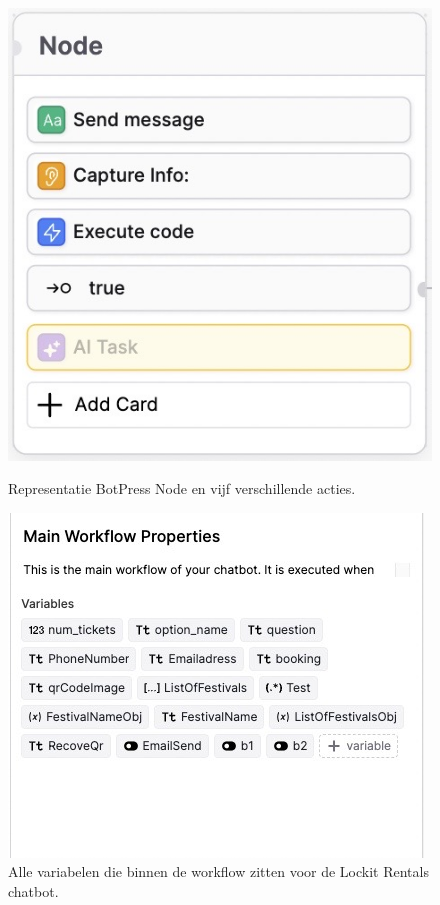 \begin{figure}[h]
    \centering
    \begin{minipage}{0.45\textwidth}
        \centering
        \includegraphics[width=\textwidth]{graphics/F31_botpress_Acties.jpg}
        \caption{Representatie BotPress Node en vijf verschillende acties.}
        \label{fig:botpressActies}
    \end{minipage}
    \hfill
    \begin{minipage}{0.45\textwidth}
        \centering
        \includegraphics[width=\textwidth]{graphics/F32_botpress_Variables.jpg}
        \caption{Alle variabelen die binnen de workflow zitten voor de Lockit Rentals chatbot.}
        \label{fig:botpressVariables}
    \end{minipage}
\end{figure}














